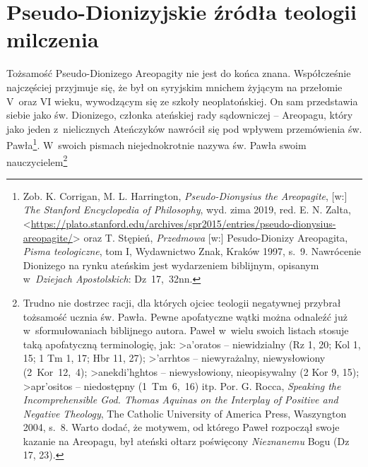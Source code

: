 \section{Pseudo-Dionizyjskie źródła teologii milczenia}\label{sil-dionizy}

Tożsamość Pseudo-Dionizego Areopagity nie jest do końca znana. Współcześnie najczęściej przyjmuje się, że był on syryjskim mnichem żyjącym na przełomie V~oraz VI wieku, wywodzącym się ze szkoły neoplatońskiej. On sam przedstawia siebie jako św. Dionizego, członka ateńskiej rady sądowniczej -- Areopagu, który jako jeden z~nielicznych Ateńczyków nawrócił się pod wpływem przemówienia św. Pawła\footnote{Zob. K. Corrigan, M. L. Harrington, \textit{Pseudo-Dionysius the Areopagite}, [w:] \textit{The Stanford Encyclopedia of Philosophy}, wyd. zima 2019, red. E. N. Zalta, {\textless}\url{https://plato.stanford.edu/archives/spr2015/entries/pseudo-dionysius-areopagite/}{\textgreater} oraz T. Stępień, \textit{Przedmowa} [w:] Pesudo-Dionizy Areopagita, \textit{Pisma teologiczne}, tom I, Wydawnictwo Znak, Kraków 1997, s.~9. Nawrócenie Dionizego na rynku ateńskim jest wydarzeniem biblijnym, opisanym w~\textit{Dziejach Apostolskich}: Dz~17,~32nn.}. W~swoich pismach niejednokrotnie nazywa św. Pawła swoim nauczycielem\footnote{Trudno nie dostrzec racji, dla których ojciec teologii negatywnej przybrał tożsamość ucznia św. Pawła. Pewne apofatyczne wątki można odnaleźć już w~sformułowaniach biblijnego autora. Paweł w~wielu swoich listach stosuje taką apofatyczną terminologię, jak:
\textgreek{>a'oratos}
-- niewidzialny (Rz 1, 20; Kol 1, 15; 1 Tm 1, 17; Hbr 11, 27);
\textgreek{>'arrhtos}
-- niewyrażalny, niewysłowiony (2~Kor~12,~4);
\textgreek{>anekdi'hghtos}
-- niewysłowiony, nieopisywalny (2 Kor 9, 15);
\textgreek{>apr'ositos}
-- niedostępny (1~Tm~6,~16) itp. Por. G. Rocca, \textit{Speaking the Incomprehensible God. Thomas Aquinas on the Interplay of Positive and Negative Theology}, The Catholic University of America Press, Waszyngton 2004, s.~8. Warto dodać, że motywem, od którego Paweł rozpoczął swoje kazanie na Areopagu, był ateński ołtarz poświęcony \textit{Nieznanemu} Bogu (Dz 17, 23).}
